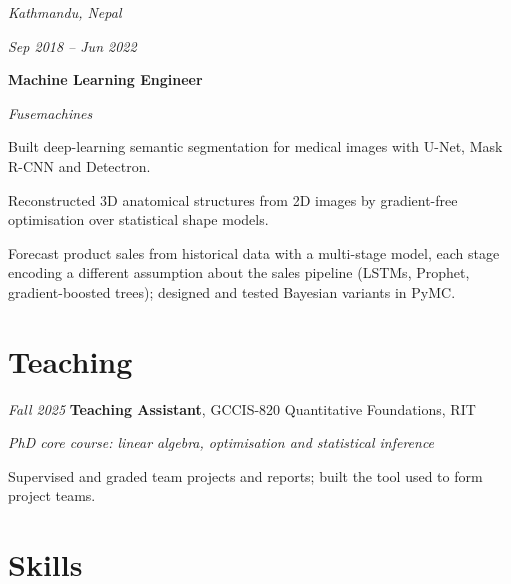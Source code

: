 \documentclass[10pt, letterpaper]{article}
\begin{document}
    \begin{twocolentry}{
        \textit{Kathmandu, Nepal}

        \textit{Sep 2018 – Jun 2022}}
        \textbf{Machine Learning Engineer}

        \textit{Fusemachines}
    \end{twocolentry}

    \vspace{0.10 cm}
    \begin{onecolentry}
        \begin{highlights}
            \item Built deep-learning semantic segmentation for medical images with U-Net, Mask R-CNN and
            Detectron.
            \item Reconstructed 3D anatomical structures from 2D images by gradient-free optimisation over
            statistical shape models.
            \item Forecast product sales from historical data with a multi-stage model, each stage encoding a
            different assumption about the sales pipeline (LSTMs, Prophet, gradient-boosted trees); designed and
            tested Bayesian variants in PyMC.
        \end{highlights}
    \end{onecolentry}


    \section{Teaching}

    \begin{twocolentry}{
        \textit{Fall 2025}}
        \textbf{Teaching Assistant}, GCCIS-820 Quantitative Foundations, RIT

        \textit{PhD core course: linear algebra, optimisation and statistical inference}
    \end{twocolentry}

    \vspace{0.10 cm}
    \begin{onecolentry}
        \begin{highlights}
            \item Supervised and graded team projects and reports; built the tool used to form project teams.
        \end{highlights}
    \end{onecolentry}


    \section{Skills}
\end{document}
